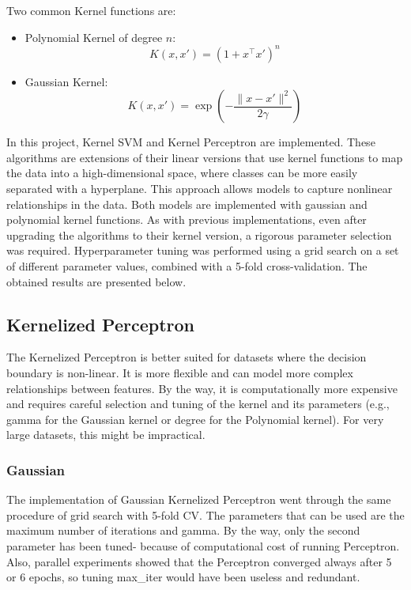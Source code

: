 \documentclass[a4paper, 10pt]{article}
\begin{document}
Two common Kernel functions are: 
\begin{itemize}
    \item Polynomial Kernel of degree \(n\):
    \[ K(x, x') = (1 + x^\top x')^n\]
    \item Gaussian Kernel: 
    \[K(x, x') = \exp\left(-\frac{\|x - x'\|^2}{2\gamma}\right)\]
\end{itemize}

In this project, Kernel SVM and Kernel Perceptron are implemented. These algorithms are extensions of their linear versions that use kernel functions to map the data into a high-dimensional space, where classes can be more easily separated with a hyperplane. This approach allows models to capture nonlinear relationships in the data.
Both models are implemented with gaussian and polynomial kernel functions.
As with previous implementations, even after upgrading the algorithms to their kernel version, a rigorous parameter selection was required. Hyperparameter tuning was performed using a grid search on a set of different parameter values, combined with a 5-fold cross-validation. The obtained results are presented below.

\subsection{Kernelized Perceptron}
The Kernelized Perceptron is better suited for datasets where the decision boundary is non-linear. It is more flexible and can model more complex relationships between features.
By the way, it is computationally more expensive and requires careful selection and tuning of the kernel and its parameters (e.g., gamma for the Gaussian kernel or degree for the Polynomial kernel). For very large datasets, this might be impractical.


\subsubsection{Gaussian}

The implementation of Gaussian Kernelized Perceptron went through the same procedure of grid search with 5-fold CV. The parameters that can be used are the maximum number of iterations and gamma. By the way, only the second parameter has been tuned- because of computational cost of running Perceptron. Also, parallel experiments showed that the Perceptron converged always after 5 or 6 epochs, so tuning max\_iter would have been useless and redundant.
\end{document}
